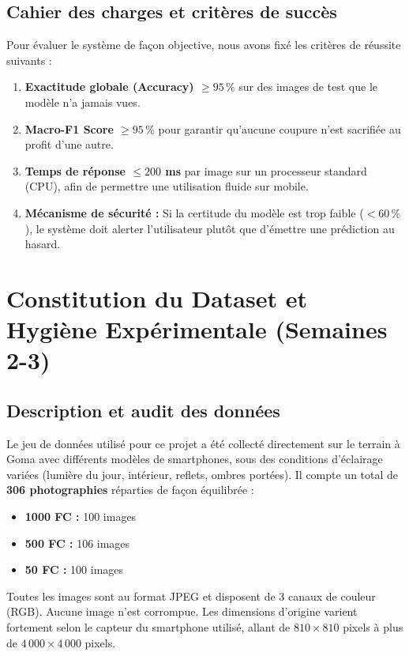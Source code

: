 \documentclass[11pt,a4paper]{article}
\begin{document}
\subsection{Cahier des charges et critères de succès}
Pour évaluer le système de façon objective, nous avons fixé les critères de réussite suivants :
\begin{enumerate}
    \item \textbf{Exactitude globale (Accuracy) $\ge 95\,\%$} sur des images de test que le modèle n'a jamais vues.
    \item \textbf{Macro-F1 Score $\ge 95\,\%$} pour garantir qu'aucune coupure n'est sacrifiée au profit d'une autre.
    \item \textbf{Temps de réponse $\le 200$ ms} par image sur un processeur standard (CPU), afin de permettre une utilisation fluide sur mobile.
    \item \textbf{Mécanisme de sécurité :} Si la certitude du modèle est trop faible ($< 60\,\%$), le système doit alerter l'utilisateur plutôt que d'émettre une prédiction au hasard.
\end{enumerate}

\newpage
\section{Constitution du Dataset et Hygiène Expérimentale (Semaines 2-3)}

\subsection{Description et audit des données}
Le jeu de données utilisé pour ce projet a été collecté directement sur le terrain à Goma avec différents modèles de smartphones, sous des conditions d'éclairage variées (lumière du jour, intérieur, reflets, ombres portées). Il compte un total de \textbf{306 photographies} réparties de façon équilibrée :
\begin{itemize}
    \item \textbf{1000 FC :} 100 images
    \item \textbf{500 FC :} 106 images
    \item \textbf{50 FC :} 100 images
\end{itemize}

Toutes les images sont au format JPEG et disposent de 3 canaux de couleur (RGB). Aucune image n'est corrompue. Les dimensions d'origine varient fortement selon le capteur du smartphone utilisé, allant de $810 \times 810$ pixels à plus de $4\,000 \times 4\,000$ pixels.
\end{document}
